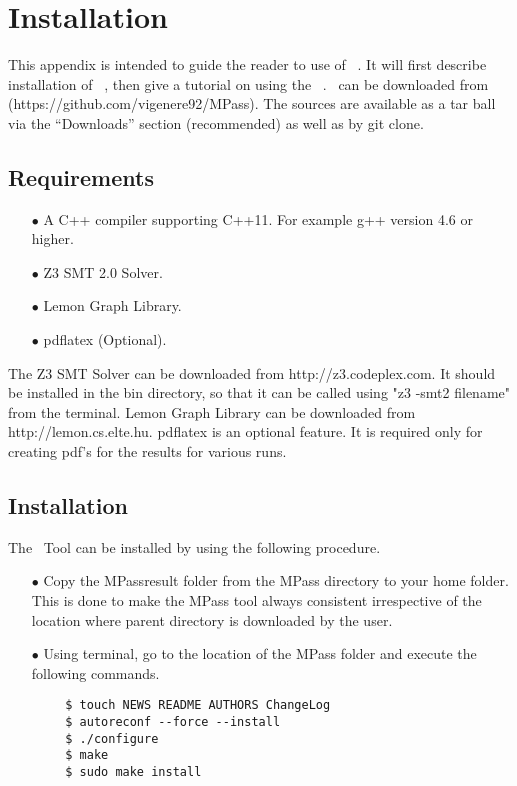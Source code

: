 \newpage
\renewcommand\thesection{\Alph{section}}
\setcounter{section}{0}
\section {Installation}
This appendix is intended to guide the reader to use of \MPass\ . It will first describe
installation of \MPass\ , then give a tutorial on using the \MPass\ . \MPass\ can be downloaded from \cite{github.MPass} (https://github.com/vigenere92/MPass).
The sources are available as a tar ball via the “Downloads” section (recommended) as well as by git clone.

\subsection{Requirements}
\begin{itemize}
    \item[$\bullet$] A C++ compiler supporting C++11. For example g++ version 4.6 or higher.

    \item[$\bullet$] Z3 SMT 2.0 Solver. 

    \item[$\bullet$] Lemon Graph Library.

    \item[$\bullet$] pdflatex (Optional).
\end{itemize}

The Z3 SMT Solver can be downloaded from  http://z3.codeplex.com. It should be installed in the bin directory, so that it can be called using
"z3 -smt2 filename" from the terminal. Lemon Graph Library can be downloaded from http://lemon.cs.elte.hu. pdflatex is an optional feature. It is required
only for creating pdf's for the results for various runs.


\subsection{Installation}
The \MPass\ Tool can be installed by using the following procedure.
\begin{itemize}
    \item[$\bullet$] Copy the MPass\textunderscore result folder from the MPass directory to your home folder. This is done to make the MPass tool always consistent irrespective of the location where parent directory is downloaded by the user.
    \item[$\bullet$] Using terminal, go to the location of the MPass folder and execute the following commands.
\end{itemize}
\begin{Verbatim}
        $ touch NEWS README AUTHORS ChangeLog
        $ autoreconf --force --install
        $ ./configure
        $ make
        $ sudo make install
\end{Verbatim}

